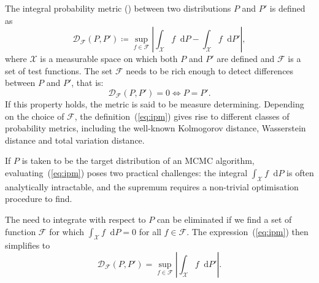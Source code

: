\documentclass[11pt,a4paper]{report}
\newcommand*\diff{\mathop{}\!\mathrm{d}}
\begin{document}
The integral probability metric (\cite{mullerIntegralProbabilityMetrics1997}) between two distributions $P$ and $P'$ is defined as
\begin{equation}
\mathcal{D}_{\mathcal{F}}(P, P') \coloneq \sup_{f \in \mathcal{F}}\left|\int_\mathcal{X} f \diff P - \int_\mathcal{X} f \diff P' \right|,
\label{eq:ipm}
\end{equation}
where $\mathcal{X}$ is a measurable space on which both $P$ and $P'$ are defined and $\mathcal{F}$ is a set of test functions. The set $\mathcal{F}$ needs to be rich enough to detect differences between $P$ and $P'$, that is:
\begin{equation*}
\mathcal{D}_{\mathcal{F}}(P, P') = 0 \iff P = P'.
\end{equation*}
If this property holds, the metric is said to be measure determining.
Depending on the choice of $\mathcal{F}$, the definition~(\ref{eq:ipm}) gives rise to different classes of probability metrics, including the well-known Kolmogorov distance, Wasserstein distance and total variation distance.

If $P$ is taken to be the target distribution of an MCMC algorithm, evaluating~(\ref{eq:ipm}) poses two practical challenges: the integral $\int_\mathcal{X} f \diff P$ is often analytically intractable, and the supremum requires a non-trivial optimisation procedure to find.

The need to integrate with respect to $P$ can be eliminated if we find a set of function $\mathcal{F}$ for which $\int_\mathcal{X} f \diff P = 0$ for all $f \in \mathcal{F}$. The expression~(\ref{eq:ipm}) then simplifies to
\begin{equation}
\mathcal{D}_{\mathcal{F}}(P, P') = \sup_{f \in \mathcal{F}}\left|\int_\mathcal{X} f \diff P' \right|.
\label{eq:stein-discrepancy-sup}
\end{equation}
\end{document}
